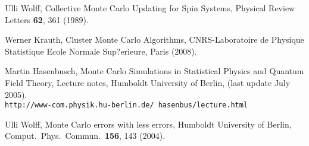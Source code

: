 \documentclass[12pt] {report} %
\begin{document}
\begin{thebibliography}{}
		 Ulli Wolff, Collective Monte Carlo Updating for Spin Systems, Physical Review Letters  {\bf 62}, 361 (1989).
	
		
		 Werner Krauth, Cluster Monte Carlo Algorithms, CNRS-Laboratoire de Physique Statistique
		Ecole Normale Sup?erieure, Paris (2008).
		
		 Martin Hasenbusch, Monte Carlo Simulations in Statistical Physics and Quantum Field Theory, Lecture notes, Humboldt University of Berlin, (last update July 2005). \\
		\texttt{http://www-com.physik.hu-berlin.de/~hasenbus/lecture.html}
		
		 Ulli Wolff, Monte Carlo errors with less errors, Humboldt University of Berlin, Comput.\ Phys.\ Commun.\  {\bf 156}, 143 (2004).
		
	\end{thebibliography}{}
		
\end{document}
